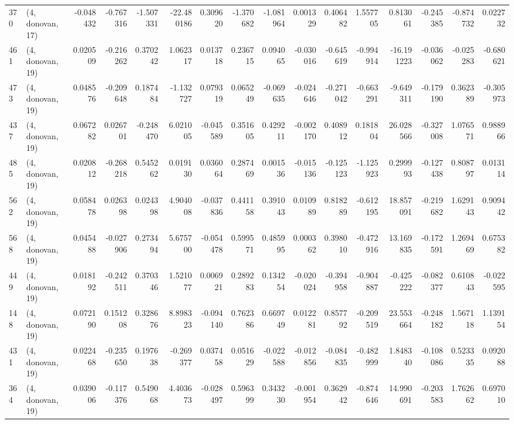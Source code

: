 \begin{tabular}{llrrrrrrrrrrrrrr}
370 &  (4, donovan, 17) &  -0.048432 & -0.767316 & -1.507331 &  -22.480186 &  0.309620 &  -1.370682 &  -1.081964 &  0.001329 &  0.406482 &  1.557705 &    0.813061 & -0.245385 &  -0.874732 &   0.022732 \\
461 &  (4, donovan, 19) &   0.020509 & -0.216262 &  0.370242 &    1.062317 &  0.013718 &   0.236715 &   0.094065 & -0.030016 & -0.645619 & -0.994914 &  -16.191223 & -0.036062 &  -0.025283 &  -0.680621 \\
473 &  (4, donovan, 19) &   0.048576 & -0.209648 &  0.187484 &   -1.132727 &  0.079319 &   0.065249 &  -0.069635 & -0.024646 & -0.271042 & -0.663291 &   -9.649311 & -0.179190 &   0.362389 &  -0.305973 \\
437 &  (4, donovan, 19) &   0.067282 &  0.026701 & -0.248470 &    6.021005 & -0.045589 &   0.351605 &   0.429211 & -0.002170 &  0.408912 &  0.181804 &   26.028566 & -0.327008 &   1.076571 &   0.988966 \\
485 &  (4, donovan, 19) &   0.020812 & -0.268218 &  0.545262 &    0.019130 &  0.036064 &   0.287469 &   0.001536 & -0.015136 & -0.125123 & -1.125923 &    0.299993 & -0.127438 &   0.808797 &   0.013114 \\
562 &  (4, donovan, 19) &   0.058478 &  0.026398 &  0.024398 &    4.904008 & -0.037836 &   0.441158 &   0.391043 &  0.010989 &  0.818289 & -0.612195 &   18.857091 & -0.219682 &   1.629143 &   0.909442 \\
568 &  (4, donovan, 19) &   0.045488 & -0.027906 &  0.273494 &    5.675700 & -0.054478 &   0.599571 &   0.485995 &  0.000362 &  0.398010 & -0.472916 &   13.169835 & -0.172591 &   1.269469 &   0.675382 \\
449 &  (4, donovan, 19) &   0.018192 & -0.242511 &  0.370346 &    1.521077 &  0.006921 &   0.289283 &   0.134254 & -0.020024 & -0.394958 & -0.904887 &   -0.425222 & -0.082377 &   0.610843 &  -0.022595 \\
148 &  (4, donovan, 19) &   0.072190 &  0.151208 &  0.328676 &    8.898323 & -0.094140 &   0.762386 &   0.669749 &  0.012281 &  0.857792 & -0.209519 &   23.553664 & -0.248182 &   1.567118 &   1.139154 \\
431 &  (4, donovan, 19) &   0.022468 & -0.235650 &  0.197638 &   -0.269377 &  0.037458 &   0.051629 &  -0.022588 & -0.012856 & -0.084835 & -0.482999 &    1.848340 & -0.108086 &   0.523335 &   0.092088 \\
364 &  (4, donovan, 19) &   0.039006 & -0.117376 &  0.549068 &    4.403673 & -0.028497 &   0.596399 &   0.343230 & -0.001954 &  0.362942 & -0.874646 &   14.990691 & -0.203583 &   1.762662 &   0.697010 \\

\end{tabular}
